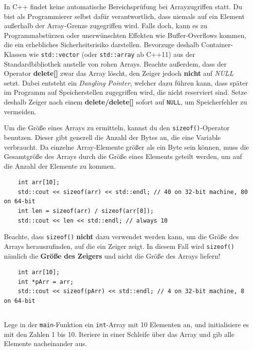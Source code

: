 In C++ findet keine automatische Bereichsprüfung bei Arrayzugriffen statt.
Du bist als Programmierer selbst dafür verantwortlich, dass niemals auf ein Element außerhalb der Array-Grenze zugegriffen wird.
Falls doch, kann es zu Programmabstürzen oder unerwünschten Effekten wie  Buffer-Overflows kommen, die ein erhebliches Sicherheitsrisiko darstellen.
Bevorzuge deshalb Container-Klassen wie \texttt{std::vector} (oder \texttt{std::array} ab C++11) aus der Standardbibliothek anstelle von \glqq rohen\grqq{} Arrays.
Beachte außerdem, dass der Operator \textbf{delete[]} zwar das Array löscht, den Zeiger jedoch \textbf{nicht} auf \emph{NULL} setzt.
Dabei entsteht ein \emph{Dangling Pointer}, welcher dazu führen kann, dass später im Programm auf Speicherstellen zugegriffen wird, die nicht reserviert sind.
Setze deshalb Zeiger nach einem \textbf{delete/delete[]} sofort auf \texttt{NULL}, um Speicherfehler zu vermeiden.

Um die Größe eines Arrays zu ermitteln, kannst du den \texttt{sizeof()}-Operator benutzen. Dieser gibt generell die Anzahl der Bytes an, die eine Variable verbraucht. Da einzelne Array-Elemente größer als ein Byte sein können, muss die Gesamtgröße des Arrays durch die Größe eines Elements geteilt werden, um auf die Anzahl der Elemente zu kommen.

\begin{lstlisting}
	int arr[10];
	std::cout << sizeof(arr) << std::endl; // 40 on 32-bit machine, 80 on 64-bit
	int len = sizeof(arr) / sizeof(arr[0]);
	std::cout << len << std::endl; // always 10
\end{lstlisting}

Beachte, dass \texttt{sizeof()} \textbf{nicht} dazu verwendet werden kann, um die Größe des Arrays herauszufinden, auf die ein Zeiger zeigt.
In diesem Fall wird \texttt{sizeof()} nämlich die \textbf{Größe des Zeigers} und nicht die Größe des Arrays liefern!

\begin{lstlisting}
	int arr[10];
	int *pArr = arr;
	std::cout << sizeof(pArr) << std::endl; // 4 on 32-bit machine, 8 on 64-bit
\end{lstlisting}

\subsection{}
Lege in der \texttt{main}-Funktion ein \texttt{int}-Array mit 10 Elementen an, und initialisiere es mit den Zahlen 1 bis 10.
Iteriere in einer Schleife über das Array und gib alle Elemente nacheinander aus.

